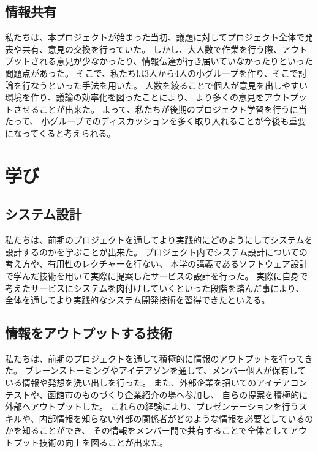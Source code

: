 \documentclass[openany,11pt,papersize]{jsbook}
\begin{document}
\subsection{情報共有}
 私たちは、本プロジェクトが始まった当初、議題に対してプロジェクト全体で発表や共有、意見の交換を行っていた。
しかし、大人数で作業を行う際、アウトプットされる意見が少なかったり、情報伝達が行き届いていなかったりといった問題点があった。
そこで、私たちは3人から4人の小グループを作り、そこで討論を行なうといった手法を用いた。
人数を絞ることで個人が意見を出しやすい環境を作り、議論の効率化を図ったことにより、
より多くの意見をアウトプットさせることが出来た。
よって、私たちが後期のプロジェクト学習を行うに当たって、
小グループでのディスカッションを多く取り入れることが今後も重要になってくると考えられる。

\section{学び}
\subsection{システム設計}
 私たちは、前期のプロジェクトを通してより実践的にどのようにしてシステムを設計するのかを学ぶことが出来た。
プロジェクト内でシステム設計についての考え方や、有用性のレクチャーを行ない、
本学の講義であるソフトウェア設計で学んだ技術を用いて実際に提案したサービスの設計を行った。
実際に自身で考えたサービスにシステムを肉付けしていくといった段階を踏んだ事により、
全体を通してより実践的なシステム開発技術を習得できたといえる。
\subsection{情報をアウトプットする技術}
 私たちは、前期のプロジェクトを通して積極的に情報のアウトプットを行ってきた。
ブレーンストーミングやアイデアソンを通して、メンバー個人が保有している情報や発想を洗い出しを行った。
また、外部企業を招いてのアイデアコンテストや、函館市のものづくり企業紹介の場へ参加し、
自らの提案を積極的に外部へアウトプットした。
これらの経験により、プレゼンテーションを行うスキルや、内部情報を知らない外部の関係者がどのような情報を必要としているのかを知ることができ、
その情報をメンバー間で共有することで全体としてアウトプット技術の向上を図ることが出来た。
\end{document}
